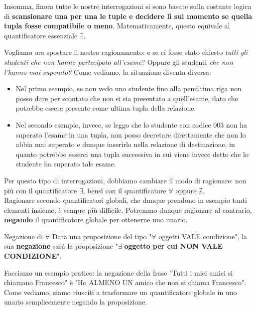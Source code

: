 \documentclass[12pt]{report}
\begin{document}
	Insomma, finora tutte le nostre interrogazioni si sono basate sulla costante logica di \textbf{scansionare una per una le tuple e decidere lì sul momento se quella tupla fosse compatibile o meno}. Matematicamente, questo equivale al quantificatore essenziale $\exists$.
	\smallbreak
	
	Vogliamo ora spostare il nostro ragionamento: e se ci fosse stato chiesto \textit{tutti gli studenti che non hanno partecipato all'esame}? Oppure gli studenti \textit{che non l'hanno mai superato?} Come vediamo, la situazione diventa diversa:
	\begin{itemize}
		\item Nel primo esempio, se non vedo uno studente fino alla penultima riga non posso dare per scontato che non si sia presentato a quell'esame, dato che potrebbe essere presente come ultima tupla della relazione.
		
		\item Nel secondo esempio, invece, se leggo che lo studente con codice 003 non ha superato l'esame in una tupla, non posso decretare direttamente che non lo abbia mai superato e dunque inserirlo nella relazione di destinazione, in quanto potrebbe esserci una tupla successiva in cui viene invece detto che lo studente ha superato tale esame.
	\end{itemize}
	Per questo tipo di interrogazioni, dobbiamo cambiare il modo di ragionare: non più con il quantificatore $\exists$, bensì con il quantificatore $\forall$ oppure $\nexists$.\\
	
	Ragionare secondo quantificatori globali, che dunque prendono in esempio tanti elementi insieme, è sempre più difficile. Potremmo dunque ragionare al contrario, \textbf{negando} il quantificatore globale per ottenerne uno unario.
	\begin{definizione}{Negazione di $\forall$}{}
		Data una proposizione del tipo "$\forall$ oggetti VALE condizione", la sua \textbf{negazione} sarà la proposizione "$\mathbf{\exists}$ \textbf{oggetto per cui NON VALE CONDIZIONE}".
		\smallbreak
		
		Facciamo un esempio pratico: la negazione della frase "Tutti i miei amici si chiamano Francesco" è "Ho ALMENO UN amico che non si chiama Francesco". Come vediamo, siamo riusciti a trasformare un quantificatore globale in uno unario semplicemente negando la proposizione.
	\end{definizione}
	
\end{document}
